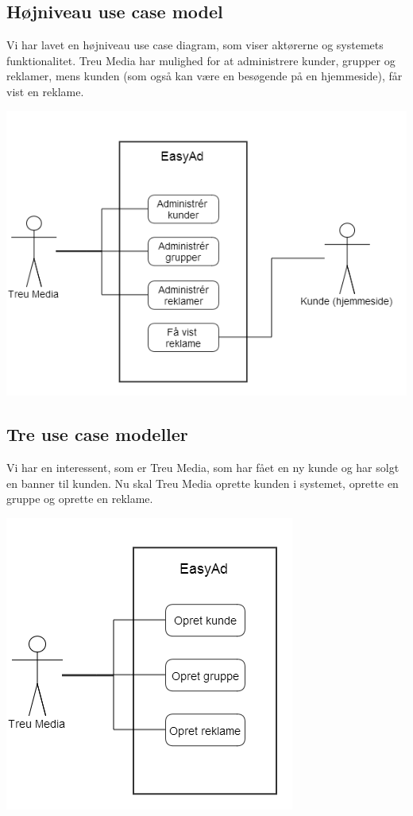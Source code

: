 \documentclass[a4paper,12pt]{article}
\begin{document}
\subsection{Højniveau use case model}
Vi har lavet en højniveau use case diagram, som viser aktørerne og systemets funktionalitet. Treu Media har mulighed for at administrere kunder, grupper og reklamer, mens kunden (som også kan være en besøgende på en hjemmeside), får vist en reklame.

\includegraphics[width=\linewidth]{use_case.png}

\subsection{Tre use case modeller}
Vi har en interessent, som er Treu Media, som har fået en ny kunde og har solgt en banner til kunden. Nu skal Treu Media oprette kunden i systemet, oprette en gruppe og oprette en reklame.

\includegraphics[scale=0.5]{three_use_cases.png}
\end{document}
